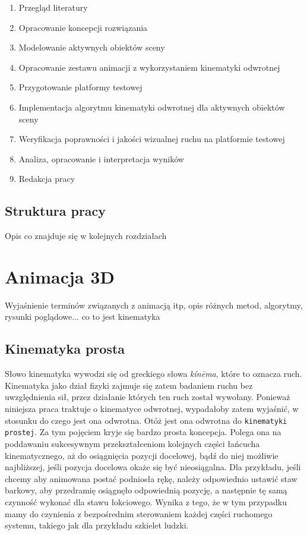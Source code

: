 \documentclass[11pt]{mwrep}
\begin{document}
\begin{enumerate}

\item Przegląd literatury
\item Opracowanie koncepcji rozwiązania
\item Modelowanie aktywnych obiektów sceny
\item Opracowanie zestawu animacji z wykorzystaniem kinematyki odwrotnej
\item Przygotowanie platformy testowej
\item Implementacja algorytmu kinematyki odwrotnej dla aktywnych obiektów sceny
\item Weryfikacja poprawności i jakości wizualnej ruchu na platformie testowej
\item Analiza, opracowanie i interpretacja wyników
\item Redakcja pracy

\end{enumerate}

  \section{Struktura pracy}

Opis co znajduje się w kolejnych rozdziałach

\chapter{Animacja 3D}

Wyjaśnienie terminów związanych z animacją itp, opis różnych metod, algorytmy, rysunki poglądowe...
co to jest kinematyka

  \section{Kinematyka prosta}

 Słowo kinematyka wywodzi się od greckiego słowa \textit{kín\={e}ma}, które to oznacza ruch. Kinematyka jako dział fizyki zajmuje się zatem badaniem ruchu bez uwzględnienia sił, przez działanie których ten ruch został wywołany. Ponieważ niniejsza praca traktuje o kinematyce odwrotnej, wypadałoby zatem wyjaśnić, w stosunku do czego jest ona odwrotna. Otóż jest ona odwrotna do \texttt{kinematyki prostej}. Za tym pojęciem kryje się bardzo prosta koncepcja. Polega ona na poddawaniu sukcesywnym przekształceniom kolejnych części łańcucha kinematycznego, aż do osiągnięcia pozycji docelowej, bądź do niej możliwie najbliższej, jeśli pozycja docelowa okaże się być nieosiągalna. Dla przykładu,  jeśli chcemy aby animowana postać podniosła rękę, należy odpowiednio ustawić staw barkowy, aby przedramię osiągnęło odpowiednią pozycję, a następnie tę samą czynność wykonać dla stawu łokciowego. Wynika z tego, że w tym przypadku mamy do czynienia z bezpośrednim sterowaniem każdej części ruchomego systemu, takiego jak dla przykładu szkielet ludzki.
  
\end{document}
